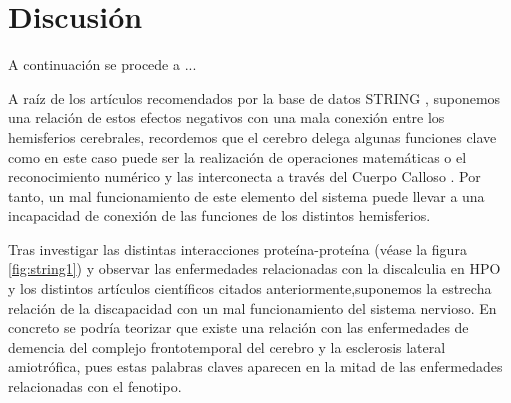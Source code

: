 \section{Discusión}

A continuación se procede a ...

\hfill

A raíz de los artículos recomendados por la base de datos STRING \cite{Walterfang2014,frontotemporal}, suponemos una relación de estos efectos negativos con una mala conexión entre los hemisferios cerebrales, recordemos que el cerebro delega algunas funciones clave como en este caso puede ser la realización de operaciones matemáticas o el reconocimiento numérico y las interconecta a través del Cuerpo Calloso \cite{CorpusCallosum}. Por tanto, un mal funcionamiento de este elemento del sistema puede llevar a una incapacidad de conexión de las funciones de los distintos hemisferios.

\hfill

Tras investigar las distintas interacciones proteína-proteína (véase la figura \ref{fig:string1}) y observar las enfermedades relacionadas con la discalculia en HPO y los distintos artículos científicos citados anteriormente,suponemos la estrecha relación de la discapacidad con un mal funcionamiento del sistema nervioso. En concreto se podría teorizar que existe una relación con las enfermedades de demencia del complejo frontotemporal del cerebro y la esclerosis lateral amiotrófica, pues estas palabras claves aparecen en la mitad de las enfermedades relacionadas con el fenotipo.




\newpage